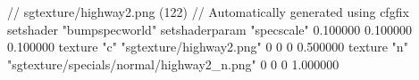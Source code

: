 // sgtexture/highway2.png (122)
// Automatically generated using cfgfix
setshader "bumpspecworld"
setshaderparam "specscale" 0.100000 0.100000 0.100000
texture "c" "sgtexture/highway2.png" 0 0 0 0.500000
texture "n" "sgtexture/specials/normal/highway2_n.png" 0 0 0 1.000000
